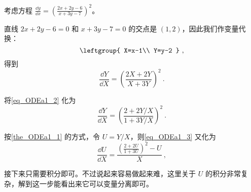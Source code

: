 \begin{example}{}
考虑方程 $\frac{\dd y}{\dd x}=(\frac{2x+2y-6}{x+3y-7})^2$。

直线 $2x+2y-6=0$ 和 $x+3y-7=0$ 的交点是 $(1, 2)$，因此我们作变量代换：
\begin{equation}
\leftgroup{
    X=x-1\\
    Y=y-2
}~,
\end{equation}
得到
\begin{equation}\label{eq_ODEa1_2}
\frac{\dd Y}{\dd X}=(\frac{2X+2Y}{X+3Y})^2~.
\end{equation}

将\autoref{eq_ODEa1_2} 化为
\begin{equation}\label{eq_ODEa1_3}
\frac{\dd Y}{\dd X}=(\frac{2+2Y/X}{1+3Y/X})^2~.
\end{equation}

按\autoref{the_ODEa1_1} 的方式，令 $U=Y/X$，则\autoref{eq_ODEa1_3} 又化为
\begin{equation}
\frac{\dd U}{\dd X}=\frac{(\frac{2+2U}{1+3U})^2-U}{X}~,
\end{equation}

接下来只需要积分即可。不过说起来容易做起来难，这里关于 $U$ 的积分非常复杂，解到这一步能看出来它可以变量分离即可。

\end{example}









